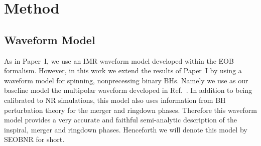 \documentclass[twocolumn,prd,superscriptaddress,amsfonts,amssymb,amsmath,preprintnumbers]{revtex4-1}
\newcommand{\paperone}{Paper~I\xspace}
\newcommand{\abhi}[1]{\textcolor{red}{[\textit{AG: #1}]}}
\begin{document}
\section{Method}
\subsection{Waveform Model}\label{sec:model}



As in \paperone, we use an IMR waveform model developed within the EOB formalism. However, in this work we extend the results of \paperone by using a waveform model for spinning, nonprecessing binary BHs. Namely we use as our baseline model the multipolar waveform developed in Ref.~\citep{Cotesta:2018fcv}. In addition to being calibrated to NR simulations, this model also uses information from BH perturbation theory for the merger and ringdown phases. Therefore this waveform model provides a very accurate and faithful semi-analytic description of the inspiral, merger and ringdown phases. Henceforth we will denote this model by SEOBNR for short.
\end{document}
